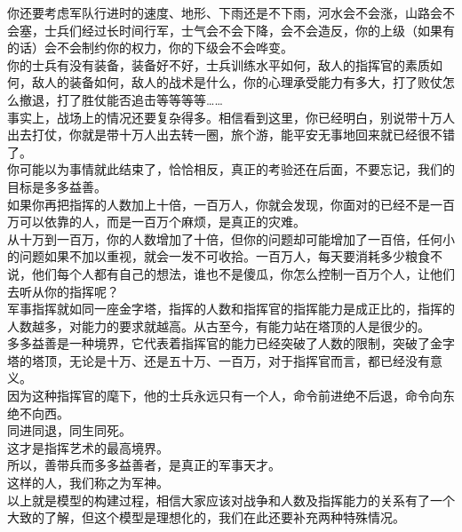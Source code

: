 \begin{multicols}{\theparacolNo}
你还要考虑军队行进时的速度、地形、下雨还是不下雨，河水会不会涨，山路会不会塞，士兵们经过长时间行军，士气会不会下降，会不会造反，你的上级（如果有的话）会不会制约你的权力，你的下级会不会哗变。\\

你的士兵有没有装备，装备好不好，士兵训练水平如何，敌人的指挥官的素质如何，敌人的装备如何，敌人的战术是什么，你的心理承受能力有多大，打了败仗怎么撤退，打了胜仗能否追击等等等等……\\

事实上，战场上的情况还要复杂得多。相信看到这里，你已经明白，别说带十万人出去打仗，你就是带十万人出去转一圈，旅个游，能平安无事地回来就已经很不错了。\\

你可能以为事情就此结束了，恰恰相反，真正的考验还在后面，不要忘记，我们的目标是多多益善。\\

如果你再把指挥的人数加上十倍，一百万人，你就会发现，你面对的已经不是一百万可以依靠的人，而是一百万个麻烦，是真正的灾难。\\

从十万到一百万，你的人数增加了十倍，但你的问题却可能增加了一百倍，任何小的问题如果不加以重视，就会一发不可收拾。一百万人，每天要消耗多少粮食不说，他们每个人都有自己的想法，谁也不是傻瓜，你怎么控制一百万个人，让他们去听从你的指挥呢？\\

军事指挥就如同一座金字塔，指挥的人数和指挥官的指挥能力是成正比的，指挥的人数越多，对能力的要求就越高。从古至今，有能力站在塔顶的人是很少的。\\

多多益善是一种境界，它代表着指挥官的能力已经突破了人数的限制，突破了金字塔的塔顶，无论是十万、还是五十万、一百万，对于指挥官而言，都已经没有意义。\\

因为这种指挥官的麾下，他的士兵永远只有一个人，命令前进绝不后退，命令向东绝不向西。\\

同进同退，同生同死。\\

这才是指挥艺术的最高境界。\\

所以，善带兵而多多益善者，是真正的军事天才。\\

这样的人，我们称之为军神。\\

以上就是模型的构建过程，相信大家应该对战争和人数及指挥能力的关系有了一个大致的了解，但这个模型是理想化的，我们在此还要补充两种特殊情况。\\


\end{multicols}
